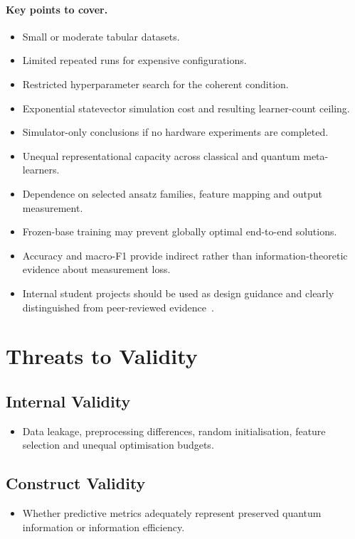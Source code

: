 \documentclass[]{UCD_CS_MSc_AAI_Report}
\newcommand{\sectionbrief}{\paragraph{Key points to cover.}}
\begin{document}
\sectionbrief
\begin{itemize}
    \item Small or moderate tabular datasets.
    \item Limited repeated runs for expensive configurations.
    \item Restricted hyperparameter search for the coherent condition.
    \item Exponential statevector simulation cost and resulting learner-count ceiling.
    \item Simulator-only conclusions if no hardware experiments are completed.
    \item Unequal representational capacity across classical and quantum meta-learners.
    \item Dependence on selected ansatz families, feature mapping and output measurement.
    \item Frozen-base training may prevent globally optimal end-to-end solutions.
    \item Accuracy and macro-F1 provide indirect rather than information-theoretic evidence about measurement loss.
    \item Internal student projects should be used as design guidance and clearly distinguished from peer-reviewed evidence~\cite{radojicic_reducing_2026,pinto_composing_2026}.
\end{itemize}

\section{Threats to Validity}
\label{sec:discussion-validity}

\subsection{Internal Validity}
\begin{itemize}
    \item Data leakage, preprocessing differences, random initialisation, feature selection and unequal optimisation budgets.
\end{itemize}

\subsection{Construct Validity}
\begin{itemize}
    \item Whether predictive metrics adequately represent preserved quantum information or information efficiency.
\end{itemize}
\end{document}
